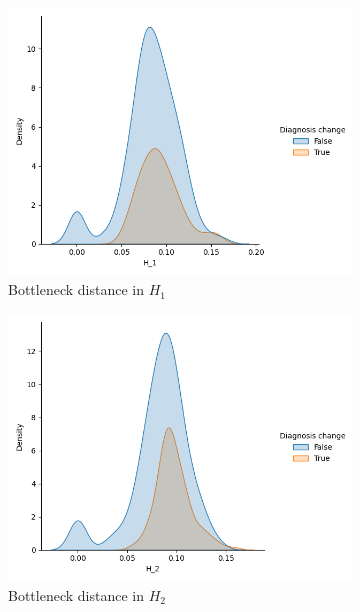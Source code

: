 \documentclass{article}
\begin{document}
\begin{figure}[htb]
\begin{subfigure}{0.32\textwidth}
    \includegraphics[width=\textwidth]{figures/temporal_evolution/bottleneck_H_1_dist_diag_change.png}
    \caption{Bottleneck distance in $H_1$}
  \end{subfigure}
  \begin{subfigure}{0.32\textwidth}
    \includegraphics[width=\textwidth]{figures/temporal_evolution/bottleneck_H_2_dist_diag_change.png}
    \caption{Bottleneck distance in $H_2$}
  \end{subfigure}
  \begin{subfigure}{0.32\textwidth}

\end{subfigure}
\end{figure}
\end{document}

